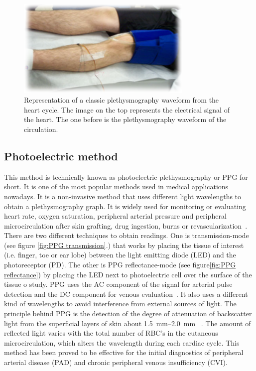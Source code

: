 \begin{figure}[!htpb]
	\centering
	\includegraphics[width=0.75\textwidth,keepaspectratio,trim={0.5cm 0.5cm 0.5cm 0.5cm}, clip]{figure4}    
	\caption[Strain gauge plethysmography]{Representation of a classic plethysmography waveform from the heart cycle. The image on the top represents the electrical signal of the heart. The one before is the plethysmography waveform of the circulation.}
	\label{fig:strain gauge}
\end{figure}


\subsection{Photoelectric method}
\label{section literature 3.4}
This method is technically known as photoelectric plethysmography or PPG for short. It is one of the most popular methods used in medical applications nowadays. It is a non-invasive method that uses different light wavelengths to obtain a plethysmography graph. It is widely used for monitoring or evaluating heart rate, oxygen saturation, peripheral arterial pressure and peripheral microcirculation after skin grafting, drug ingestion, burns or revascularization~\cite{holohan1996plethysmography}. There are two different techniques to obtain readings. One is transmission-mode (see figure \ref{fig:PPG transmission}.) that works by placing the tissue of interest (i.e. finger, toe or ear lobe) between the light emitting diode (LED) and the photoreceptor (PD).  The other is PPG reflectance-mode (see figure\ref{fig:PPG reflectance}) by placing the LED next to photoelectric cell over the surface of the tissue o study. PPG uses the AC component of the signal for arterial pulse detection and the DC component for venous evaluation~\cite{higgins1986photoplethysmographic}. It also uses a different kind of wavelengths to avoid interference from external sources of light. The principle behind PPG is the detection of the degree of attenuation of backscatter light from the superficial layers of skin about \SIrange{1.5}{2.0}{\milli\meter} ~\cite{holohan1996plethysmography,kim1986pulse}. The amount of reflected light varies with the total number of RBC’s in the cutaneous microcirculation, which alters the wavelength during each cardiac cycle. This method has been proved to be effective for the initial diagnostics of peripheral arterial disease (PAD) and chronic peripheral venous insufficiency (CVI).

